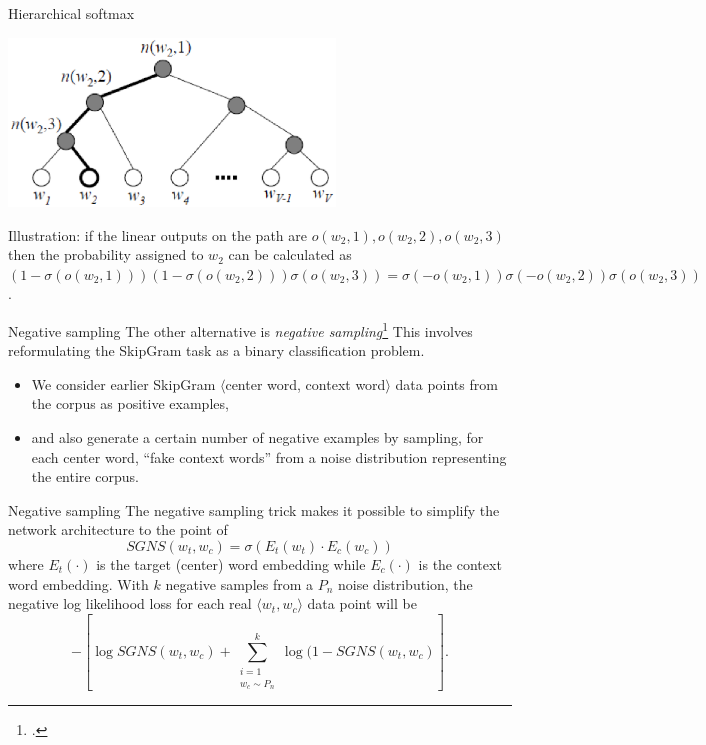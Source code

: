 \documentclass[style=upen, size=14pt]{powerdot}
\newcommand{\gold}{\color{arany}}
\theoremstyle{definition}
\begin{document}
\begin{slide}[toc=]{Hierarchical softmax}
  \begin{center}
    \includegraphics[width=0.65\textwidth]{figures/hierarchic_softmax.eps}
\end{center}
Illustration: if the linear outputs on the path are $o(w_2, 1), o(w_2, 2), o(w_2, 3)$ then the
probability assigned to $w_2$ can be calculated as
$(1-\sigma(o(w_2,1)))(1-\sigma(o(w_2,2)))\sigma(o(w_2,3))=
\sigma(-o(w_2,1))\sigma(-o(w_2,2))\sigma(o(w_2,3))$.
\end{slide}

\begin{slide}[toc=]{Negative sampling}
  The other alternative is \emph{\gold negative
    sampling}\footnote{\citet{mikolov2013distributed}.} This involves
  reformulating the SkipGram task as a binary classification problem.
  \begin{itemize}
  \item We consider earlier SkipGram $\langle$center word, context word$\rangle$
    data points from the corpus as positive examples,
  \item and also generate a certain number of negative examples by sampling, for
    each center word, ``fake context words'' from a noise distribution
    representing the entire corpus.
  \end{itemize}
\end{slide}

\begin{slide}[toc=]{Negative sampling}
  The negative sampling trick makes it possible to simplify the network
  architecture to the point of
  $$
  SGNS(w_{t}, w_{c}) = \sigma(E_t(w_t)\cdot E_c(w_c)) 
  $$
  where $E_t(\cdot)$ is the target (center) word embedding while $E_c(\cdot)$ is
  the context word embedding. With $k$ negative samples from a $P_n$ noise
  distribution, the negative log likelihood loss for each real
  $\langle w_t, w_c\rangle$ data point will be
  $$
  - [ \log SGNS(w_{t}, w_{c}) + \sum_{\substack{i=1 \\ {w}_c \sim P_n}}^k
  \log(1 - SGNS(w_{t}, {{w}_c})].  $$
\end{slide}
\end{document}
